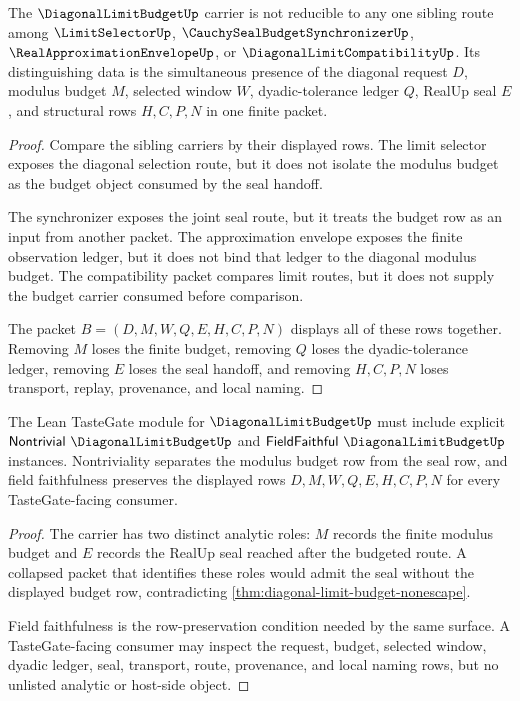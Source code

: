 \begin{theorem}
\label{thm:diagonal-limit-budget-independence-witness}
The $\DiagonalLimitBudgetUp$ carrier is not reducible to any one sibling route among $\LimitSelectorUp$, $\CauchySealBudgetSynchronizerUp$, $\RealApproximationEnvelopeUp$, or $\DiagonalLimitCompatibilityUp$. Its distinguishing data is the simultaneous presence of the diagonal request $D$, modulus budget $M$, selected window $W$, dyadic-tolerance ledger $Q$, RealUp seal $E$, and structural rows $H,C,P,N$ in one finite packet.
\end{theorem}
\begin{proof}
Compare the sibling carriers by their displayed rows. The limit selector exposes the diagonal selection route, but it does not isolate the modulus budget as the budget object consumed by the seal handoff.

The synchronizer exposes the joint seal route, but it treats the budget row as an input from another packet. The approximation envelope exposes the finite observation ledger, but it does not bind that ledger to the diagonal modulus budget. The compatibility packet compares limit routes, but it does not supply the budget carrier consumed before comparison.

The packet $B=(D,M,W,Q,E,H,C,P,N)$ displays all of these rows together. Removing $M$ loses the finite budget, removing $Q$ loses the dyadic-tolerance ledger, removing $E$ loses the seal handoff, and removing $H,C,P,N$ loses transport, replay, provenance, and local naming.
\end{proof}

\begin{theorem}
\label{thm:diagonal-limit-budget-tastegate-readiness}
The Lean TasteGate module for $\DiagonalLimitBudgetUp$ must include explicit $\mathsf{Nontrivial}\ \DiagonalLimitBudgetUp$ and $\mathsf{FieldFaithful}\ \DiagonalLimitBudgetUp$ instances. Nontriviality separates the modulus budget row from the seal row, and field faithfulness preserves the displayed rows $D,M,W,Q,E,H,C,P,N$ for every TasteGate-facing consumer.
\end{theorem}
\begin{proof}
The carrier has two distinct analytic roles: $M$ records the finite modulus budget and $E$ records the RealUp seal reached after the budgeted route. A collapsed packet that identifies these roles would admit the seal without the displayed budget row, contradicting \autoref{thm:diagonal-limit-budget-nonescape}.

Field faithfulness is the row-preservation condition needed by the same surface. A TasteGate-facing consumer may inspect the request, budget, selected window, dyadic ledger, seal, transport, route, provenance, and local naming rows, but no unlisted analytic or host-side object.
\end{proof}

